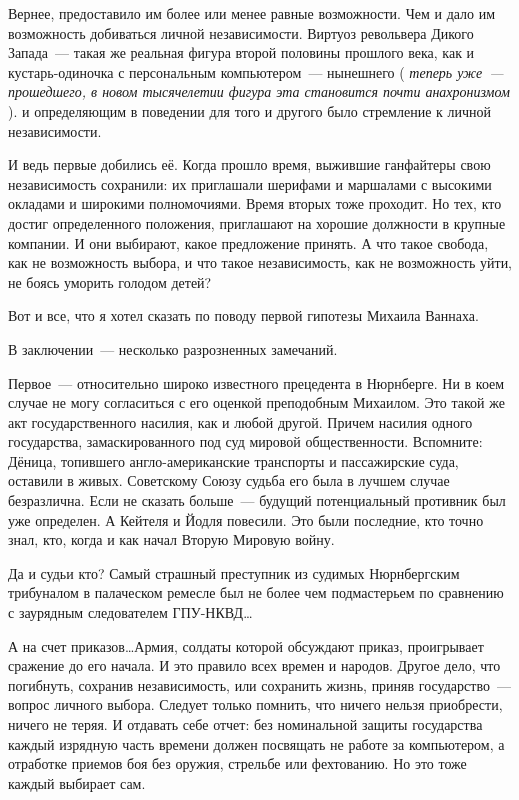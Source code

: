 Вернее, предоставило им более или менее равные возможности. Чем и дало им возможность добиваться личной независимости. Виртуоз револьвера Дикого Запада~--- такая же реальная фигура второй половины прошлого века, как и кустарь-одиночка с персональным компьютером~--- нынешнего (
\textit{теперь уже~--- прошедшего, в новом тысячелетии фигура эта становится почти анахронизмом}
). и определяющим в поведении для того и другого было стремление к личной независимости. 

И ведь первые добились её. Когда прошло время, выжившие ганфайтеры свою независимость сохранили: их приглашали шерифами и маршалами с высокими окладами и широкими полномочиями. Время вторых тоже проходит. Но тех, кто достиг определенного положения, приглашают на хорошие должности в крупные компании. И они выбирают, какое предложение принять. А что такое свобода, как не возможность выбора, и что такое независимость, как не возможность уйти, не боясь уморить голодом детей? 

Вот и все, что я хотел сказать по поводу первой гипотезы Михаила Ваннаха. 

В заключении~--- несколько разрозненных замечаний. 

Первое~--- относительно широко известного прецедента в Нюрнберге. Ни в коем случае не могу согласиться с его оценкой преподобным Михаилом. Это такой же акт государственного насилия, как и любой другой. Причем насилия одного государства, замаскированного под суд мировой общественности. Вспомните: Дёница, топившего англо-американские транспорты и пассажирские суда, оставили в живых. Советскому Союзу судьба его была в лучшем случае безразлична. Если не сказать больше~--- будущий потенциальный противник был уже определен. А Кейтеля и Йодля повесили. Это были последние, кто точно знал, кто, когда и как начал Вторую Мировую войну. 

Да и судьи кто? Самый страшный преступник из судимых Нюрнбергским трибуналом в палаческом ремесле был не более чем подмастерьем по сравнению с заурядным следователем ГПУ-НКВД\dots 

А на счет приказов\dots Армия, солдаты которой обсуждают приказ, проигрывает сражение до его начала. И это правило всех времен и народов. Другое дело, что погибнуть, сохранив независимость, или сохранить жизнь, приняв государство~--- вопрос личного выбора. Следует только помнить, что ничего нельзя приобрести, ничего не теряя. И отдавать себе отчет: без номинальной защиты государства каждый изрядную часть времени должен посвящать не работе за компьютером, а отработке приемов боя без оружия, стрельбе или фехтованию. Но это тоже каждый выбирает сам. 

